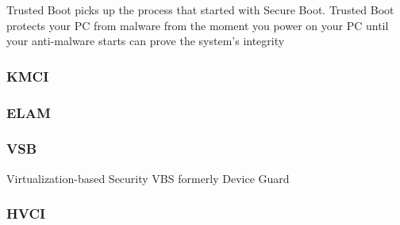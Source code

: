 Trusted Boot picks up the process that started with Secure Boot.
Trusted Boot protects your PC from malware from the moment you power on your PC until your anti-malware starts
can prove the system's integrity

\cite{microsoft-trusted-boot}
\cite{microsoft-secure-the-windows-boot-process}
\cite{understanding-windows-trusted-boot}
\subsubsection{KMCI}
\subsubsection{ELAM}

\subsubsection{VSB}
Virtualization-based Security {VBS}
formerly Device Guard
\subsubsection{HVCI}





